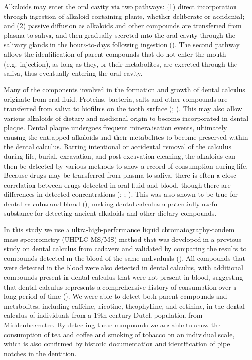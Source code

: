 \documentclass[
  b5paper,
]{book}
\begin{document}
Alkaloids may enter the oral cavity via two pathways: (1) direct
incorporation through ingestion of alkaloid-containing plants, whether
deliberate or accidental; and (2) passive diffusion as alkaloids and
other compounds are transferred from plasma to saliva, and then
gradually secreted into the oral cavity through the salivary glands in
the hours-to-days following ingestion
(). The
second pathway allows the identification of parent compounds that do not
enter the mouth (e.g.~injection), as long as they, or their metabolites,
are excreted through the saliva, thus eventually entering the oral
cavity.

Many of the components involved in the formation and growth of dental
calculus originate from oral fluid. Proteins, bacteria, salts and other
compounds are transferred from saliva to biofilms on the tooth surface
(;
). This may also
allow various alkaloids of dietary and medicinal origin to become
incorporated in dental plaque. Dental plaque undergoes frequent
mineralisation events, ultimately causing the entrapped alkaloids and
their metabolites to become preserved within the dental calculus.
Barring intentional or accidental removal of the calculus during life,
burial, excavation, and post-excavation cleaning, the alkaloids can then
be detected by various methods to show a record of consumption during
life. Because drugs may be transferred from plasma to saliva, there is
often a close correlation between drugs detected in oral fluid and
blood, though there are differences in detected concentrations
(;
;
). This was
also shown to be true for dental calculus and blood
(),
making dental calculus a potentially useful substance for detecting
ancient alkaloids and other dietary compounds.

In this study we use a ultra-high-performance liquid
chromatography-tandem mass spectrometry (UHPLC-MS/MS) method that was
developed in a previous study on dental calculus from cadavers and
validated by comparing the results to compounds detected in the blood of
the same individuals (). All compounds that were detected in the blood were also
detected in dental calculus, with additional compounds present in dental
calculus that were not present in blood, suggesting that dental calculus
represents a comprehensive history of consumption over a long period of
time ().
We were able to detect both parent compounds and metabolites, including
caffeine, nicotine, theophylline, and cotinine, in the dental calculus
of individuals from a 19th century Dutch population from Middenbeemster.
By detecting these compounds we are able to show the consumption of tea
and coffee and smoking of tobacco on an individual scale, which is also
confirmed by historic documentation and identification of pipe notches
in the dentition.
\end{document}
